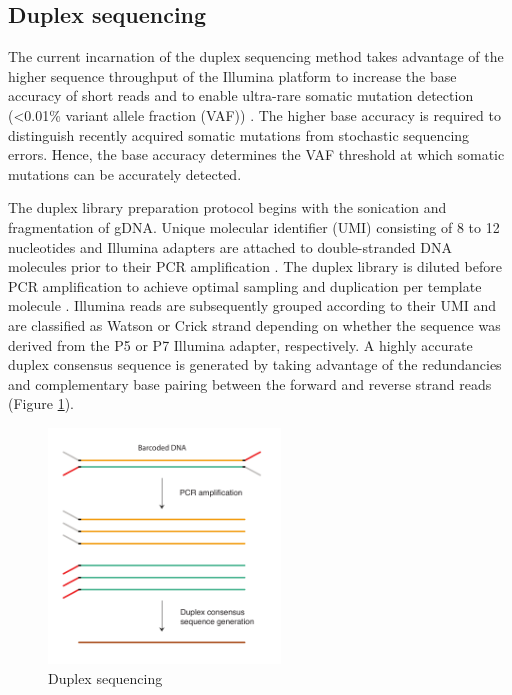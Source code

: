 \subsection{Duplex sequencing}

The current incarnation of the duplex sequencing method takes advantage of the higher sequence throughput of the Illumina platform to increase the base accuracy of short reads and to enable ultra-rare somatic mutation detection (<0.01\% variant allele fraction (VAF)) \cite{Schmitt2012-yr}. The higher base accuracy is required to distinguish recently acquired somatic mutations from stochastic sequencing errors. Hence, the base accuracy determines the VAF threshold at which somatic mutations can be accurately detected. 

The duplex library preparation protocol begins with the sonication and fragmentation of gDNA. Unique molecular identifier (UMI) consisting of 8 to 12 nucleotides and Illumina adapters are attached to double-stranded DNA molecules prior to their PCR amplification \cite{Schmitt2012-yr}. The duplex library is diluted before PCR amplification to achieve optimal sampling and duplication per template molecule \cite{Hoang2016-jx, Abascal2021-pk}. Illumina reads are subsequently grouped according to their UMI and are classified as Watson or Crick strand depending on whether the sequence was derived from the P5 or P7 Illumina adapter, respectively. A highly accurate duplex consensus sequence is generated by taking advantage of the redundancies and complementary base pairing between the forward and reverse strand reads (Figure \ref{figure:duplex-sequencing}). 

\begin{figure}[htbp!]
\caption{Duplex sequencing}
\label{figure:duplex-sequencing}
\begin{centering}
\includegraphics[width=0.55\textwidth]{Vector/duplex_sequencing.pdf}
\end{centering}
\end{figure}

